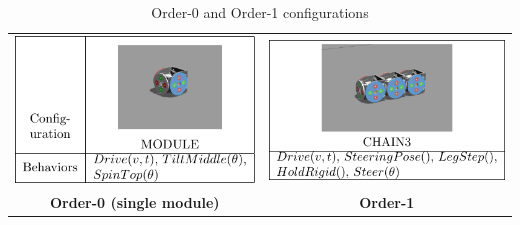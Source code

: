 \documentclass[conference]{IEEEtran}
\theoremstyle{definition}
\begin{document}
\begin{table}
     \begin{center}
        \begin{tabular}{c c}
         \includegraphics[scale=1]{images/library/tier0.pdf} &
         \includegraphics[scale=1]{images/library/tier1.pdf} \\
         \textbf{Order-0 (single module)} & \textbf{Order-1}
        \end{tabular}
         \caption{Order-0 and Order-1 configurations}
         \label{Order-1-configurations}
     \end{center}
\end{table}
\end{document}

